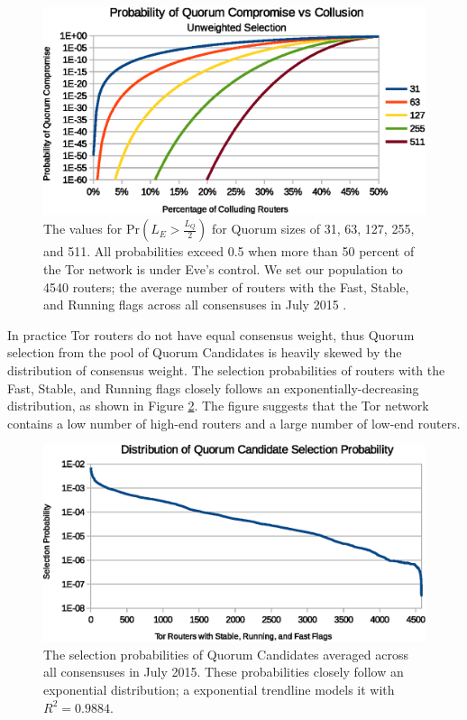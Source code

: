\documentclass[USenglish,oneside,twocolumn]{article}
\begin{document}
\begin{figure}[h]
	\centering
	\includegraphics[width=\linewidth]{../assets/analysis/QuorumSelectionUnweighted.eps}
	\caption{The values for $ \mathrm{Pr}(L_{E} > \frac{L_{Q}}{2}) $ for Quorum sizes of 31, 63, 127, 255, and 511. All probabilities exceed 0.5 when more than 50 percent of the Tor network is under Eve's control. We set our population to 4540 routers; the average number of routers with the Fast, Stable, and Running flags across all consensuses in July 2015 \cite{TorMetrics}.}
	\label{fig:quorumUnweightedMajority}
\end{figure}

In practice Tor routers do not have equal consensus weight, thus Quorum selection from the pool of Quorum Candidates is heavily skewed by the distribution of consensus weight. The selection probabilities of routers with the Fast, Stable, and Running flags closely follows an exponentially-decreasing distribution, as shown in Figure \ref{fig:weightDist}. The figure suggests that the Tor network contains a low number of high-end routers and a large number of low-end routers.

\begin{figure}[h]
	\centering
	\includegraphics[width=\linewidth]{../assets/analysis/QuorumCandidateWeights.eps}
	\caption{The selection probabilities of Quorum Candidates averaged across all consensuses in July 2015. These probabilities closely follow an exponential distribution; a exponential trendline models it with $ R^{2} = 0.9884 $.}
	\label{fig:weightDist}
\end{figure}
\end{document}

